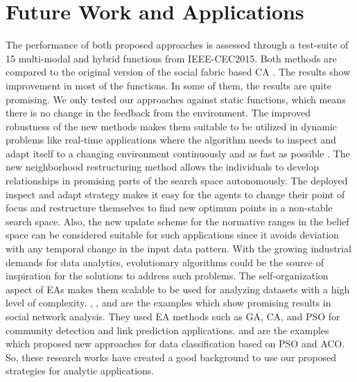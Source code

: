 \section{Future Work and Applications}
The performance of both proposed approaches is assessed through a test-suite of 15 multi-modal and hybrid functions from IEEE-CEC2015. Both methods are compared to the original version of the social fabric based CA \citet{ali2016leveraged}. The results show improvement in most of the functions. In some of them, the results are quite promising. \newline
We only tested our approaches against static functions, which means there is no change in the feedback from the environment. The improved robustness of the new methods makes them suitable to be utilized in dynamic problems like real-time applications where the algorithm needs to inspect and adapt itself to a changing environment continuously and as fast as possible \citet{che2010robust}. The new neighborhood restructuring method allows the individuals to develop relationships in promising parts of the search space autonomously. The deployed inspect and adapt strategy makes it easy for the agents to change their point of focus and restructure themselves to find new optimum points in a non-stable search space. Also, the new update scheme for the normative ranges in the belief space can be considered suitable for such applications since it avoids deviation with any temporal change in the input data pattern.\newline
With the growing industrial demands for data analytics, evolutionary algorithms could be the source of inspiration for the solutions to address such problems. The self-organization aspect of EAs makes them scalable to be used for analyzing datasets with a high level of complexity. \citet{xiaodong2008web}, \citet{pizzuti2008ga}, and \citet{sherkat2015structural} are the examples which show promising results in social network analysis. They used EA methods such as GA, CA, and PSO for community detection and link prediction applications. \citet{sousa2004particle} and \citet{otero2012inducing} are the examples which proposed new approaches for data classification based on PSO and ACO. So, these research works have created a good background to use our proposed strategies for analytic applications. 